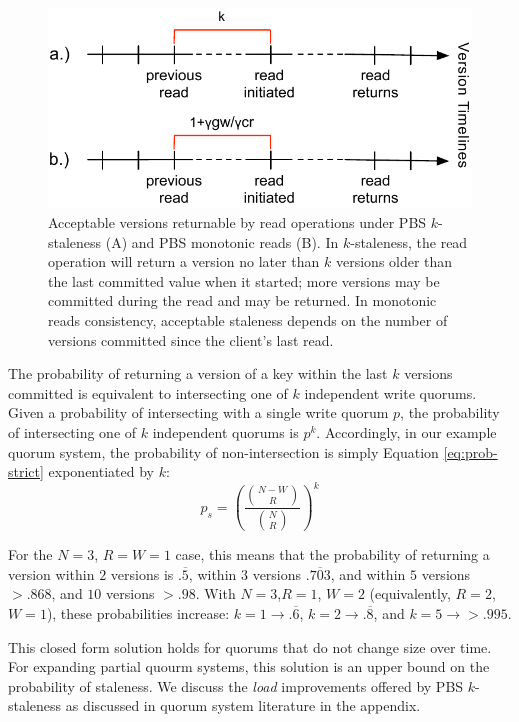 \documentclass{vldb}
\begin{document}
\begin{figure}
\centering
\includegraphics[width=\columnwidth]{figs/timelines.pdf}
\vspace{-16pt}
\caption{Acceptable versions returnable by read operations under PBS
  $k$-staleness (A) and PBS monotonic reads (B). In $k$-staleness, the
  read operation will return a version no later than $k$ versions
  older than the last committed value when it started; more versions
  may be committed during the read and may be returned.  In monotonic
  reads consistency, acceptable staleness depends on the number of
  versions committed since the client's last read.}
\vspace{-12pt}
\label{fig:timelines}
\end{figure}

The probability of returning a version of a key within the last $k$
versions committed is equivalent to intersecting one of $k$
independent write quorums.  Given a probability of intersecting with a
single write quorum $p$, the probability of intersecting one of $k$
independent quorums is $p^k$.  Accordingly, in our example quorum
system, the probability of non-intersection is simply Equation
\ref{eq:prob-strict} exponentiated by $k$:
\begin{equation}
\label{eq:k-consistency}
p_{s} = \left(\frac{{N-W \choose R}}{{N \choose R}}\right)^k
\end{equation}

For the $N$$=$$3$, $R$$=$$W$$=$$1$ case, this means that the
probability of returning a version within $2$ versions is
$.\overline{5}$, within $3$ versions $.\overline{703}$, and within $5$
versions $> .868$, and $10$ versions $>.98$.  With
$N$$=$$3$,$R$$=$$1$, $W$$=$$2$ (equivalently, $R$$=$$2$, $W$$=$$1$),
these probabilities increase: $k$$=$$1 \rightarrow .\overline{6}$, $k$$=$$2
\rightarrow .\overline{8}$, and $k$$=$$5 \rightarrow > .995$.

This closed form solution holds for quorums that do not change size
over time.  For expanding partial quourm systems, this solution is an
upper bound on the probability of staleness.  We discuss the
\textit{load} improvements offered by PBS $k$-staleness as discussed
in quorum system literature in the appendix.
\end{document}

